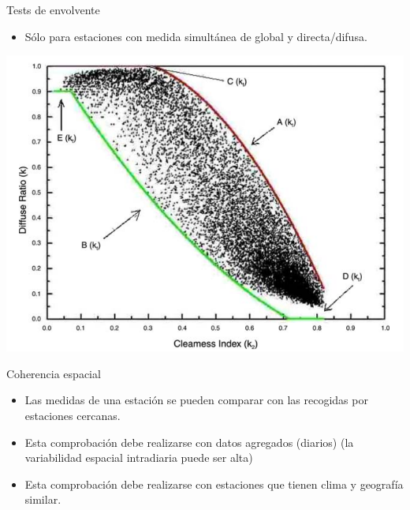 \documentclass[xcolor={usenames,svgnames,dvipsnames}]{beamer}
\begin{document}
\begin{frame}[label={sec:org2af19eb}]{Tests de envolvente}
\begin{itemize}
\item Sólo para estaciones con medida simultánea de global y directa/difusa.
\end{itemize}

\begin{center}
\includegraphics[width=.9\linewidth]{../figs/ConsistencyTest.png}
\end{center}

\nocite{Younes.Claywell.ea2005}
\end{frame}

\begin{frame}[label={sec:org168a707}]{Coherencia espacial}
\begin{itemize}
\item Las medidas de una estación se pueden comparar con las recogidas por estaciones cercanas.
\item Esta comprobación debe realizarse con \alert{datos agregados} (diarios) (la variabilidad espacial intradiaria puede ser alta)
\item Esta comprobación debe realizarse con estaciones que tienen \alert{clima y geografía similar}.
\end{itemize}

\nocite{Journee.Bertrand2011}
\end{frame}
\end{document}
